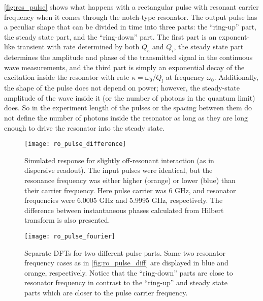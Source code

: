 \autoref{fig:res_pulse} shows what happens with a rectangular pulse with resonant carrier frequency when it comes through the notch-type resonator. The output pulse has a peculiar shape that can be divided in time into three parts: the ``ring-up'' part, the steady state part, and the ``ring-down'' part. The first part is an exponent-like transient with rate determined by both $Q_e$ and $Q_i$, the steady state part  determines the amplitude and phase of the transmitted  signal in the continuous wave measurements, and the third part is simply an exponential decay of the excitation inside the resonator with rate $\kappa = \omega_0/Q_l$ at frequency $\omega_0$. Additionally, the shape of the pulse does not depend on power; however, the steady-state amplitude of the wave inside it (or the number of photons in the quantum limit) does. So in the experiment length of the pulses or the spacing between them do not define the number of photons inside the resonator as long as they are long enough to drive the resonator into the steady state.

\begin{figure}[h!]
\texttt{[image: ro\_pulse\_difference]}
\caption{Simulated response for slightly off-resonant interaction (as in dispersive readout). The input pulses were identical, but the resonance frequency was either higher (orange) or lower (blue) than their carrier frequency. Here pulse carrier was 6 GHz, and resonator frequencies were 6.0005 GHz and 5.9995 GHz, respectively. The difference between instantaneous phases calculated from Hilbert transform is also presented.}
\label{fig:ro_pulse_diff}
\end{figure}

\begin{figure}[h!]
\texttt{[image: ro\_pulse\_fourier]}
\caption{Separate DFTs for two different pulse parts. Same two resonator frequency cases as in \autoref{fig:ro_pulse_diff} are displayed in blue and orange, respectively. Notice that the ``ring-down'' parts are close to resonator frequency in contrast to the ``ring-up'' and steady state parts which are closer to the pulse carrier frequency.}
\end{figure}

